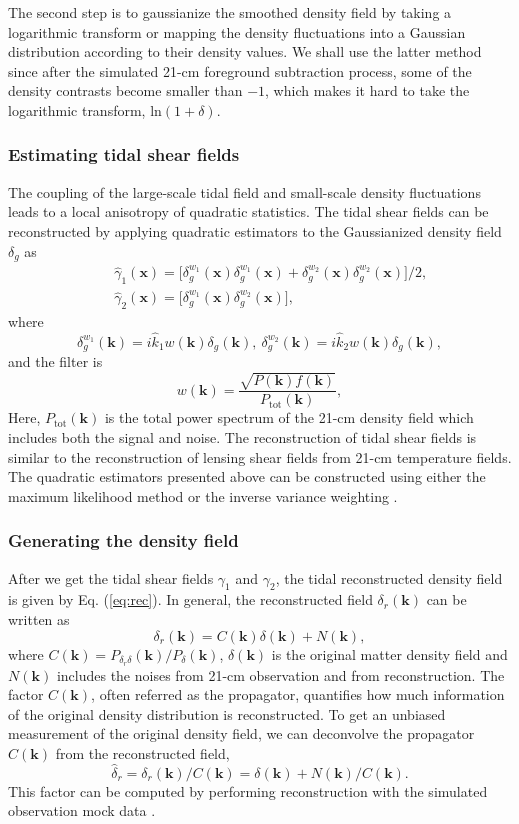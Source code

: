\documentclass[prd,superscriptaddress,floatfix,notitlepage,nofootinbib,reprint]{revtex4-1}
\newcommand{\mr}{\mathrm}
\newcommand{\bmk}{\bm{k}}
\newcommand{\bmx}{\bm{x}}
\newcommand{\bea}{\begin{equation}}
\newcommand{\eea}{\end{equation}}
\begin{document}
The second step is to gaussianize the smoothed density field by taking a 
logarithmic transform or mapping the density fluctuations into a Gaussian 
distribution according to their density values. 
We shall use the latter method since after the simulated 21-cm foreground 
subtraction process, some of the density contrasts become smaller than $-1$,
which makes it hard to take the logarithmic transform, $\mathrm{ln}(1+\delta)$.

\subsubsection{Estimating tidal shear fields}

The coupling of the large-scale tidal field and small-scale density fluctuations
leads to a local anisotropy of quadratic statistics.
The tidal shear fields can be reconstructed by applying quadratic estimators to
the Gaussianized density field $\delta_g$ as
\begin{eqnarray}
&&\hat{\gamma}_1(\bmx)=\big[\delta_g^{w_1}(\bmx)\delta_g^{w_1}(\bmx)+
\delta_g^{w_2}(\bmx)\delta_g^{w_2}(\bmx)\big]/2, \nonumber \\
&&\hat{\gamma}_2(\bmx)=\big[\delta_g^{w_1}(\bmx)\delta_g^{w_2}(\bmx)\big],
\end{eqnarray}
where 
\bea    
\delta_g^{w_1}(\bmk)=i\hat{k}_1w(\bmk)\delta_g(\bmk),\ 
\delta_g^{w_2}(\bmk)=i\hat{k}_2w(\bmk)\delta_g(\bmk),
\eea
and the filter is
\bea
w(\bmk)=\frac{\sqrt{P(\bmk)f(\bmk)}}{P_\mr{tot}(\bmk)},
\eea
Here, $P_\mr{tot}(\bmk)$ is the total power spectrum of
the 21-cm density field which includes both the signal and noise.
The reconstruction of tidal shear fields is similar to the reconstruction of
lensing shear fields from 21-cm temperature fields.
The quadratic estimators presented above can be constructed using either 
the maximum likelihood method or the inverse variance weighting 
\cite{2008LensingEst,2010LensingEst,2012LensingEst}.

\subsubsection{Generating the density field}

After we get the tidal shear fields $\gamma_1$ and $\gamma_2$, the tidal 
reconstructed density field is given by Eq. (\ref{eq:rec}).
In general, the reconstructed field $\delta_r(\bmk)$ can be written as
\bea
\delta_r(\bmk)=C(\bmk)\delta(\bmk)+N(\bmk),
\eea
where $C(\bmk)=P_{\delta_r\delta}(\bmk)/P_{\delta}(\bmk)$, $\delta(\bmk)$ is 
the original  matter density field and $N(\bmk)$ includes the noises from
21-cm observation and from reconstruction. 
The factor $C(\bmk)$, often referred as the propagator, quantifies how much 
information of the original density distribution is reconstructed.
To get an unbiased measurement of the original density field, we can deconvolve 
the propagator $C(\bmk)$ from the reconstructed field,
\bea
\label{eq:delta}
\hat{\delta}_r=\delta_r(\bmk)/C(\bmk)=\delta(\bmk)+N(\bmk)/C(\bmk).
\eea
This factor can be computed by performing reconstruction with the simulated
observation mock data \cite{2017NR2,2017FM,2017NR3}. 
\end{document}
